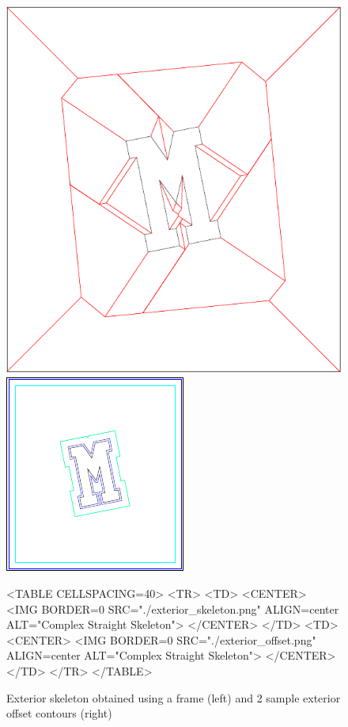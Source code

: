 \begin{figure}[htbp]
\begin{ccTexOnly}
\begin{center}
\includegraphics{Straight_skeleton_2/exterior_skeleton} %
\end{center}
\begin{center}
\includegraphics{Straight_skeleton_2/exterior_offset} %
\end{center}
\end{ccTexOnly}

\begin{ccHtmlOnly}
<TABLE CELLSPACING=40>
<TR>
<TD>
<CENTER>
<IMG BORDER=0 SRC="./exterior_skeleton.png" ALIGN=center ALT="Complex Straight Skeleton">
</CENTER>
</TD>
<TD>
<CENTER>
<IMG BORDER=0 SRC="./exterior_offset.png" ALIGN=center ALT="Complex Straight Skeleton">
</CENTER>
</TD>
</TR>
</TABLE>
\end{ccHtmlOnly}

\caption{Exterior skeleton obtained using a frame (left) and 2 sample exterior offset contours (right)
\label{Exterior}}
\end{figure}

